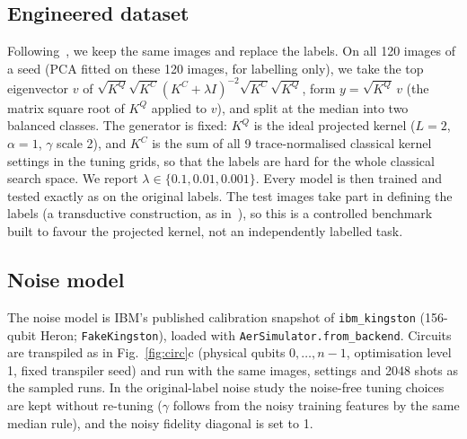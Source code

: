 \documentclass[conference]{IEEEtran}
\begin{document}
\subsection{Engineered dataset}\label{sec:eng}
Following~\cite{huang2021}, we keep the same images and replace the labels. On all 120 images of a seed (PCA fitted on these 120 images, for labelling only), we take the top eigenvector $v$ of $\sqrt{K^Q}\sqrt{K^C}(K^C+\lambda I)^{-2}\sqrt{K^C}\sqrt{K^Q}$, form $y=\sqrt{K^Q}\,v$ (the matrix square root of $K^Q$ applied to $v$), and split at the median into two balanced classes. The generator is fixed: $K^Q$ is the ideal projected kernel ($L=2$, $\alpha=1$, $\gamma$ scale 2), and $K^C$ is the sum of all 9 trace-normalised classical kernel settings in the tuning grids, so that the labels are hard for the whole classical search space. We report $\lambda\in\{0.1,0.01,0.001\}$. Every model is then trained and tested exactly as on the original labels. The test images take part in defining the labels (a transductive construction, as in~\cite{huang2021}), so this is a controlled benchmark built to favour the projected kernel, not an independently labelled task.

\subsection{Noise model}\label{sec:noise}
The noise model is IBM's published calibration snapshot of \texttt{ibm\_kingston} (156-qubit Heron; \texttt{FakeKingston}), loaded with \texttt{AerSimulator.from\_backend}. Circuits are transpiled as in Fig.~\ref{fig:circ}c (physical qubits $0,\dots,n-1$, optimisation level 1, fixed transpiler seed) and run with the same images, settings and 2048 shots as the sampled runs. In the original-label noise study the noise-free tuning choices are kept without re-tuning ($\gamma$ follows from the noisy training features by the same median rule), and the noisy fidelity diagonal is set to 1.
\end{document}
